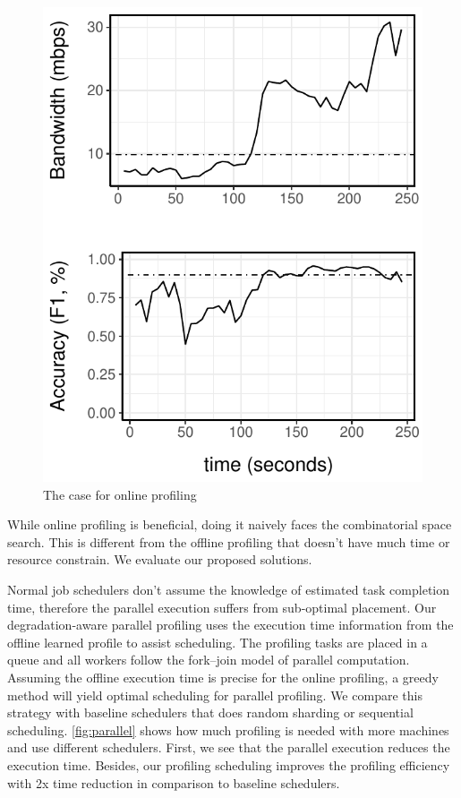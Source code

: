 \begin{figure}[htb]
  \centering
  \includegraphics[width=\columnwidth]{figures/offline-online-profiling.pdf}
  \caption{The case for online profiling}
  \label{fig:online-profiling-comparison}
\end{figure}

While online profiling is beneficial, doing it naively faces the combinatorial
space search. This is different from the offline profiling that doesn't have
much time or resource constrain. We evaluate our proposed solutions.

 Normal job schedulers don't assume
the knowledge of estimated task completion time, therefore the parallel
execution suffers from sub-optimal placement. Our degradation-aware parallel
profiling uses the execution time information from the offline learned profile
to assist scheduling. The profiling tasks are placed in a queue and all workers
follow the fork–join model of parallel computation. Assuming the offline
execution time is precise for the online profiling, a greedy method will yield
optimal scheduling for parallel profiling. We compare this strategy with
baseline schedulers that does random sharding or sequential scheduling.
\autoref{fig:parallel} shows how much profiling is needed with more machines and
use different schedulers. First, we see that the parallel execution reduces the
execution time. Besides, our profiling scheduling improves the profiling
efficiency with 2x time reduction in comparison to baseline schedulers.

